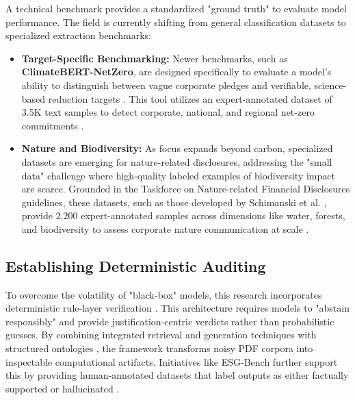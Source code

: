 A technical benchmark provides a standardized "ground truth" to evaluate model performance. The field is currently shifting from general classification datasets to specialized extraction benchmarks:
\begin{itemize}
\item 

\textbf{Target-Specific Benchmarking:} Newer benchmarks, such as \textbf{ClimateBERT-NetZero}, are designed specifically to evaluate a model’s ability to distinguish between vague corporate pledges and verifiable, science-based reduction targets  \parencite{tobias_schimanski_241ada20}. This tool utilizes an expert-annotated dataset of 3.5K text samples to detect corporate, national, and regional net-zero commitments  \parencite{tobias_schimanski_241ada20}.\item 

\textbf{Nature and Biodiversity:} As focus expands beyond carbon, specialized datasets are emerging for nature-related disclosures, addressing the "small data" challenge where high-quality labeled examples of biodiversity impact are scarce. Grounded in the Taskforce on Nature-related Financial Disclosures guidelines, these datasets, such as those developed by Schimanski et al.  \parencite{tobias_schimanski_3549ff9f}, provide 2,200 expert-annotated samples across dimensions like water, forests, and biodiversity to assess corporate nature communication at scale  \parencite{tobias_schimanski_3549ff9f}.
\end{itemize}


\subsection{Establishing Deterministic Auditing}

To overcome the volatility of "black-box" models, this research incorporates deterministic rule-layer verification  \parencite{steven_paul_nohr_a6874924}. This architecture requires models to "abstain responsibly" and provide justification-centric verdicts rather than probabilistic guesses. By combining integrated retrieval and generation techniques  \parencite[]{g_saipooja_m_n_488bfdd6, tanay_gupta_aafe0c6a} with structured ontologies  \parencite{kaoukis__georgios_35bab107}, the framework transforms noisy PDF corpora into inspectable computational artifacts. Initiatives like ESG-Bench further support this by providing human-annotated datasets that label outputs as either factually supported or hallucinated  \parencite[]{siqi_sun_c8f93141, association_for_artificial_intelligence_2026_86e12eae}.
